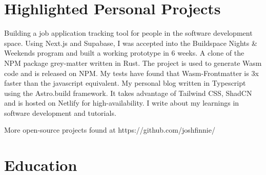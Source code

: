 \documentclass{ast_resume}
\begin{document}
\section{Highlighted Personal Projects}

{
Building a job application tracking tool for people in the software development space. Using Next.js and Supabase, I was accepted into the Buildspace Nights \& Weekends program and built a working prototype in 6 weeks.
}
\vspace{1em}
{
A clone of the NPM package grey-matter written in Rust. The project is used to generate Wasm code and is released on NPM. My tests have found that Wasm-Frontmatter is 3x faster than the javascript equivalent.
}
\vspace{1em}
{
My personal blog written in Typescript using the Astro.build framework. It takes advantage of Tailwind CSS, ShadCN and is hosted on Netlify for high-availability. I write about my learnings in software development and tutorials.
}
\vspace{1em}
\centerline{\footnotesize{More open-source projects found at https://github.com/joshfinnie/}}

\section{Education}


\end{document}

